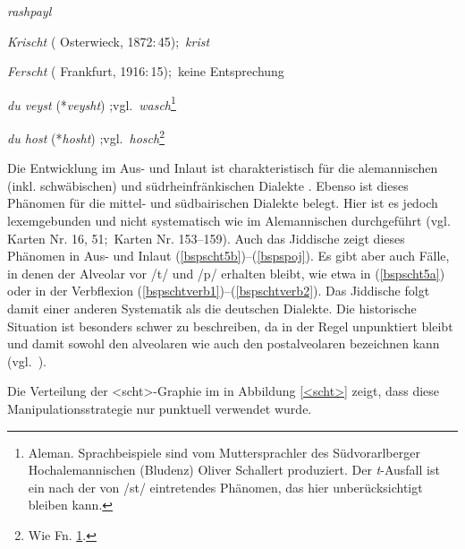 {{  \item {\oj}  \textit{rashpayl}  \label{bspspoj} %
  
 \item \textit{Krischt}  ( Osterwieck, 1872:\,45);\, {\oj}  \textit{krist}
  \label{bspscht5a}
 
 
   \item \textit{Ferscht}  ( Frankfurt, 1916:\,15);\, keine {\oj} Entsprechung
 \label{bspscht4}



\item {\oj}  \textit{du veyst} (*\textit{veysht}) ;vgl.\, {\aleman} \textit{wasch}\footnote{\label{fnalemannisch}Aleman. Sprachbeispiele sind vom Muttersprachler des Südvorarlberger Hochalemannischen (Bludenz) Oliver Schallert produziert. Der \textit{t}-Ausfall ist ein nach der  von /st/ eintretendes Phänomen, das hier unberücksichtigt bleiben kann.}
\label{bspschtverb1}

\item {\oj}  \textit{du host} (*\textit{hosht}) ;vgl.\, {\aleman} \textit{hosch}\footnote{Wie Fn. \ref{fnalemannisch}.}
\label{bspschtverb2}

 }


Die Entwicklung im Aus- und Inlaut ist charakteristisch für die alemannischen (inkl. schwäbischen) und südrheinfränkischen Dialekte \parencite[361]{Schirmunski1962}. Ebenso ist dieses Phänomen für die mittel- und südbairischen Dialekte belegt. Hier ist es jedoch lexemgebunden und nicht systematisch wie im Alemannischen durchgeführt (vgl.\,  Karten Nr. 16, 51;\,   Karten Nr. 153–159). Auch das Jiddische zeigt dieses Phänomen in Aus- und Inlaut (\ref{bspscht5b})–(\ref{bspspoj}). Es gibt aber auch Fälle, in denen der Alveolar vor /t/ und /p/ erhalten bleibt, wie etwa in (\ref{bspscht5a}) oder in der Verbflexion (\ref{bspschtverb1})–(\ref{bspschtverb2}). Das Jiddische folgt damit einer anderen Systematik als die deutschen Dialekte. Die historische Situation ist besonders schwer zu beschreiben, da  in der Regel unpunktiert bleibt und damit sowohl den alveolaren wie auch den postalveolaren  bezeichnen kann (vgl.\, \citealt[153, 272]{Timm1987}). 

Die Verteilung der <scht>-Graphie im  in Abbildung \ref{<scht>} zeigt, dass diese Manipulationsstrategie nur punktuell verwendet wurde.

}
